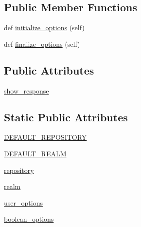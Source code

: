 \subsection*{Public Member Functions}
\begin{DoxyCompactItemize}
\item 
def \hyperlink{classsetuptools_1_1__distutils_1_1config_1_1PyPIRCCommand_acba1900bf51b67f68e9671d119e247b9}{initialize\+\_\+options} (self)
\item 
def \hyperlink{classsetuptools_1_1__distutils_1_1config_1_1PyPIRCCommand_abee2a9b6bbe4258e4d86c62c79991892}{finalize\+\_\+options} (self)
\end{DoxyCompactItemize}
\subsection*{Public Attributes}
\begin{DoxyCompactItemize}
\item 
\hyperlink{classsetuptools_1_1__distutils_1_1config_1_1PyPIRCCommand_ad7f9e2298e83c99ea82a267dae72206c}{show\+\_\+response}
\end{DoxyCompactItemize}
\subsection*{Static Public Attributes}
\begin{DoxyCompactItemize}
\item 
\hyperlink{classsetuptools_1_1__distutils_1_1config_1_1PyPIRCCommand_a26b774d2d587eadb54c5e9aa8fae4b1a}{D\+E\+F\+A\+U\+L\+T\+\_\+\+R\+E\+P\+O\+S\+I\+T\+O\+RY}
\item 
\hyperlink{classsetuptools_1_1__distutils_1_1config_1_1PyPIRCCommand_a0778a7fab8a6e55f810a97fa053ed677}{D\+E\+F\+A\+U\+L\+T\+\_\+\+R\+E\+A\+LM}
\item 
\hyperlink{classsetuptools_1_1__distutils_1_1config_1_1PyPIRCCommand_a91f23ec23713df545e3b75a505f7d8ee}{repository}
\item 
\hyperlink{classsetuptools_1_1__distutils_1_1config_1_1PyPIRCCommand_a4d9cb29c93936ab89d63c1583f95a77a}{realm}
\item 
\hyperlink{classsetuptools_1_1__distutils_1_1config_1_1PyPIRCCommand_a5d675b717841d865b995e2e46413032e}{user\+\_\+options}
\item 
\hyperlink{classsetuptools_1_1__distutils_1_1config_1_1PyPIRCCommand_a2a86255d125ae56b463dc589013cf46c}{boolean\+\_\+options}
\end{DoxyCompactItemize}



